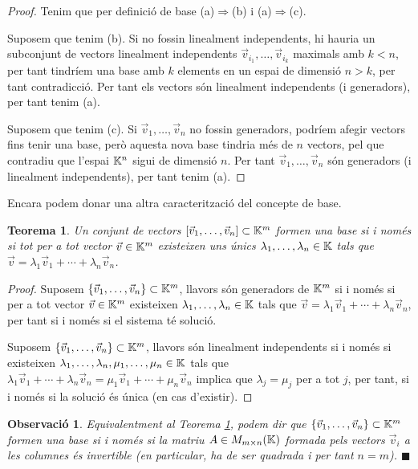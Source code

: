\documentclass[
  11pt,
]{book}
\numberwithin{dummy}{section}
\theoremstyle{maincolornumbox}
\newtheorem{theorem}{TTTT}[chapter]
\newtheorem{theoremeT}{Teorema}[chapter]
\newtheorem{remarkT}{Observació}[chapter]
\theoremstyle{blacknumex}
\theoremstyle{blacknumbox}
\theoremstyle{maincolornum}
\renewenvironment{theorem}{\begin{tBox}\begin{theoremeT}}{\end{theoremeT}\end{tBox}}
\newenvironment{remark}{\begin{remarkT}}{\hfill{\tiny\ensuremath{\blacksquare}}\end{remarkT}}
\newlength\esp
\begin{document}
\begin{proof}
Tenim que per definició de base (a)\(\Rightarrow\)(b) i
(a)\(\Rightarrow\)(c).

Suposem que tenim (b). Si no fossin linealment independents, hi hauria
un subconjunt de vectors linealment independents
\(\vec v_{i_1}, \dots, \vec v_{i_k}\) maximals amb \(k<n\), per tant
tindríem una base amb \(k\) elements en un espai de dimensió \(n>k\), per
tant contradicció. Per tant els vectors són linealment independents (i
generadors), per tant tenim (a).

Suposem que tenim (c). Si \(\vec v_1, \dots, \vec v_n\) no fossin
generadors, podríem afegir vectors fins tenir una base, però aquesta
nova base tindria més de \(n\) vectors, pel que contradiu que l'espai
\(\mathbb{K}^n\) sigui de dimensió \(n\). Per tant \(\vec v_1, \dots, \vec v_n\) són
generadors (i linealment independents), per tant tenim (a).
\end{proof}

Encara podem donar una altra caracterització del concepte de base.

\begin{theorem}
\protect\hypertarget{thm:base-coord-uniq}{}\label{thm:base-coord-uniq}Un conjunt de
vectors \([\vec v_1, \dots, \vec v_n] \subset \mathbb{K}^m\) formen una base si i
només si tot per a tot vector \(\vec v\in \mathbb{K}^m\) existeixen uns únics
\(\lambda_1, \dots, \lambda_n\in\mathbb{K}\) tals que
\(\vec v=\lambda_1\vec v_1+\cdots + \lambda_n\vec v_n\).
\end{theorem}

\begin{proof}
Suposem \(\{\vec v_1, \dots, \vec v_n\} \subset \mathbb{K}^m\), llavors
són generadors de \(\mathbb{K}^m\) si i només si per a tot vector \(\vec v\in \mathbb{K}^m\)
existeixen \(\lambda_1, \dots, \lambda_n\in\mathbb{K}\) tals que
\(\vec v=\lambda_1\vec v_1+\cdots + \lambda_n\vec v_n\), per tant si i
només si el sistema té solució.

Suposem \(\{\vec v_1, \dots, \vec v_n\} \subset \mathbb{K}^m\), llavors són
linealment independents si i només si existeixen
\(\lambda_1, \dots, \lambda_n,\mu_1,\dots, \mu_n\in\mathbb{K}\) tals que
\(\lambda_1\vec v_1+\cdots + \lambda_n\vec v_n=\mu_1\vec v_1+\cdots + \mu_n\vec v_n\)
implica que \(\lambda_j=\mu_j\) per a tot \(j\), per tant, si i només si la
solució és única (en cas d'existir).
\end{proof}

\begin{remark}
Equivalentment al Teorema
\ref{thm:base-coord-uniq}, podem dir que
\(\{\vec v_1, \dots, \vec v_n\} \subset \mathbb{K}^m\) formen una base si i només
si la matriu \(A\in M_{m\times n}(\mathbb{K})\) formada pels vectors \(\vec v_i\) a
les columnes és invertible (en particular, ha de ser quadrada i per tant
\(n=m\)).
\end{remark}
\end{document}
